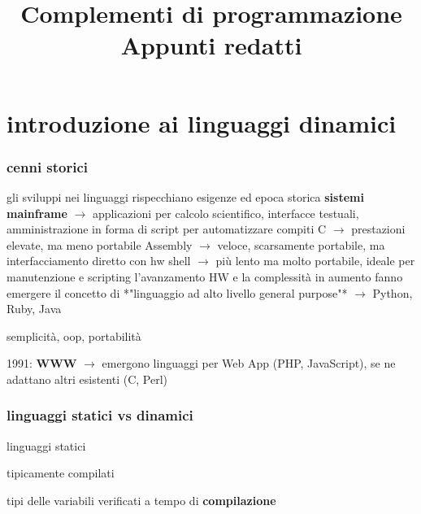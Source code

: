 
\usepackage{csquotes}
\usepackage{minted}
\graphicspath{ {/Users/hoolywear/Library/Mobile Documents/iCloud~com~logseq~logseq/Documents/hlywr-main/assets/} }

\title{%
  Complementi di programmazione \\
\large Appunti redatti}


\maketitle
\tableofcontents
\newpage

\part{introduzione ai linguaggi dinamici}

\section{cenni storici}

gli sviluppi nei linguaggi rispecchiano esigenze ed epoca storica
\textbf{sistemi mainframe} $\rightarrow$ applicazioni per calcolo scientifico, interfacce testuali, amministrazione in forma di script per automatizzare compiti
C $\rightarrow$ prestazioni elevate, ma meno portabile
Assembly $\rightarrow$ veloce, scarsamente portabile, ma interfacciamento diretto con hw
shell $\rightarrow$ pi\`u lento ma molto portabile, ideale per manutenzione e scripting
l'avanzamento HW e la complessit\`a in aumento fanno emergere il concetto di *"linguaggio ad alto livello general purpose"*
$\rightarrow$ Python, Ruby, Java

semplicit\`a, oop, portabilit\`a

1991: \textbf{WWW} $\rightarrow$ emergono linguaggi per Web App (PHP, JavaScript), se ne adattano altri esistenti (C, Perl)

\section{linguaggi statici vs dinamici}

linguaggi statici

tipicamente compilati

tipi delle variabili verificati a tempo di \textbf{compilazione}

